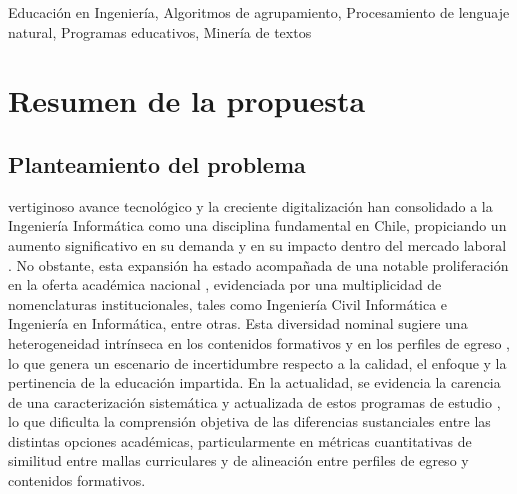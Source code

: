 \documentclass[journal,twoside,web]{ieeecolor}
\begin{document}
\begin{IEEEkeywords}
Educación en Ingeniería, Algoritmos de agrupamiento, Procesamiento de lenguaje natural, Programas educativos, Minería de textos


\end{IEEEkeywords}



\section{Resumen de la propuesta}\label{sec:resumen}

    
\subsection{Planteamiento del problema} \label{planteamiento}

 vertiginoso avance tecnológico y la creciente digitalización han consolidado a la Ingeniería Informática como una disciplina fundamental en Chile, propiciando un aumento significativo en su demanda y en su impacto dentro del mercado laboral \cite{cepal202X}. No obstante, esta expansión ha estado acompañada de una notable proliferación en la oferta académica nacional \cite{sies2024informe}, evidenciada por una multiplicidad de nomenclaturas institucionales, tales como Ingeniería Civil Informática e Ingeniería en Informática, entre otras. Esta diversidad nominal sugiere una heterogeneidad intrínseca en los contenidos formativos y en los perfiles de egreso \cite{mineduc2021propuesta}, lo que genera un escenario de incertidumbre respecto a la calidad, el enfoque y la pertinencia de la educación impartida. En la actualidad, se evidencia la carencia de una caracterización sistemática y actualizada de estos programas de estudio \cite{mineduc2021propuesta}, lo que dificulta la comprensión objetiva de las diferencias sustanciales entre las distintas opciones académicas, particularmente en métricas cuantitativas de similitud entre mallas curriculares y de alineación entre perfiles de egreso y contenidos formativos.
    
\end{document}
